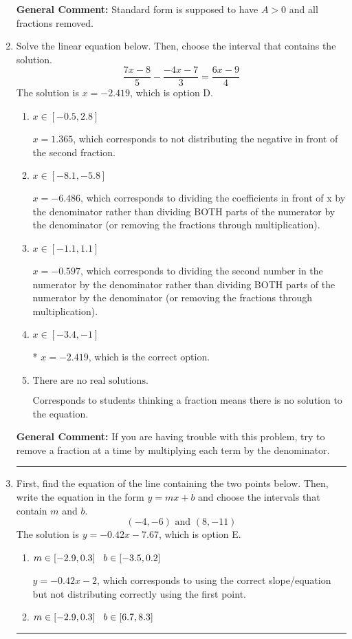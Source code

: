 \documentclass{extbook}[14pt]
\newcommand{\litem}[1]{\item #1

\rule{\textwidth}{0.4pt}}
\begin{document}
\begin{enumerate}
{\textbf{General Comment:} Standard form is supposed to have $A > 0$ and all fractions removed.
}
\litem{
Solve the linear equation below. Then, choose the interval that contains the solution.
\[ \frac{7x -8}{5} - \frac{-4x -7}{3} = \frac{6x -9}{4} \]The solution is \( x = -2.419 \), which is option D.\begin{enumerate}[label=\Alph*.]
\item \( x \in [-0.5, 2.8] \)

 $x = 1.365$, which corresponds to not distributing the negative in front of the second fraction.
\item \( x \in [-8.1, -5.8] \)

 $x = -6.486$, which corresponds to dividing the coefficients in front of x by the denominator rather than dividing BOTH parts of the numerator by the denominator (or removing the fractions through multiplication).
\item \( x \in [-1.1, 1.1] \)

 $x = -0.597$, which corresponds to dividing the second number in the numerator by the denominator rather than dividing BOTH parts of the numerator by the denominator (or removing the fractions through multiplication).
\item \( x \in [-3.4, -1] \)

* $x = -2.419$, which is the correct option.
\item \( \text{There are no real solutions.} \)

Corresponds to students thinking a fraction means there is no solution to the equation.
\end{enumerate}

\textbf{General Comment:} If you are having trouble with this problem, try to remove a fraction at a time by multiplying each term by the denominator.
}
\litem{
First, find the equation of the line containing the two points below. Then, write the equation in the form $ y=mx+b $ and choose the intervals that contain $m$ and $b$.
\[ (-4, -6) \text{ and } (8, -11) \]The solution is \( y = -0.42x -7.67 \), which is option E.\begin{enumerate}[label=\Alph*.]
\item \( m \in [-2.9, 0.3] \hspace*{3mm} b \in [-3.5, 0.2] \)

 $y = -0.42x -2$, which corresponds to using the correct slope/equation but not distributing correctly using the first point.
\item \( m \in [-2.9, 0.3] \hspace*{3mm} b \in [6.7, 8.3] \)


\end{enumerate}}
\end{enumerate}
\end{document}
